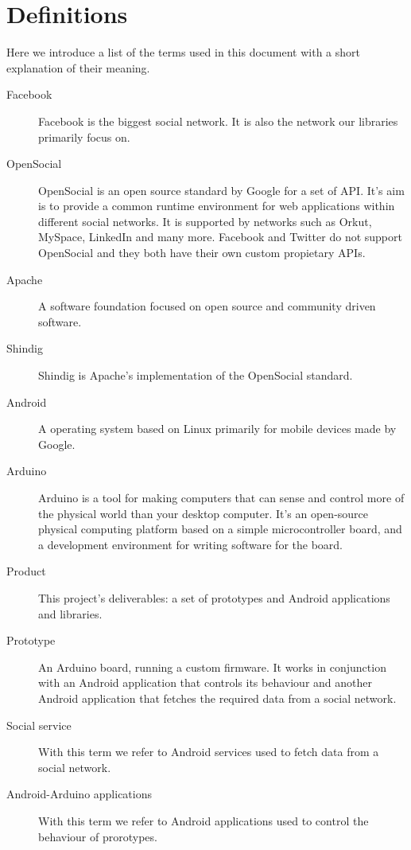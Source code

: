 \section{Definitions}

Here we introduce a list of the terms used in this document with a short explanation of their meaning.

\begin{description}
\item[Facebook] Facebook is the biggest social network. It is also the network our libraries primarily focus on.
\item[OpenSocial] OpenSocial\cite{link:opensocial} is an open source standard by Google for a set of API. It's aim is to
provide a common runtime environment for web applications within different social networks. It is supported by networks
such as Orkut, MySpace, LinkedIn and many more. Facebook and Twitter do not support OpenSocial and they both have their
own custom propietary APIs.
\item[Apache] A software foundation focused on open source and community driven software.
\item[Shindig] Shindig is Apache's implementation of the OpenSocial standard.
\item[Android] A operating system based on Linux primarily for mobile devices made by Google.
\item[Arduino] Arduino is a tool for making computers that can sense and control more of the physical world than your
desktop computer. It's an open-source physical computing platform based on a simple microcontroller board, and a development
environment for writing software for the board. \cite{link:arduino}
\item[Product] This project's deliverables: a set of prototypes and Android applications and libraries.
\item[Prototype] An Arduino board, running a custom firmware. It works in conjunction with an Android application
that controls its behaviour and another Android application that fetches the required data from a social network.
\item[Social service] With this term we refer to Android services used to fetch data from a social network.
\item[Android-Arduino applications] With this term we refer to Android applications used to control the behaviour of prorotypes.
\end{description}
